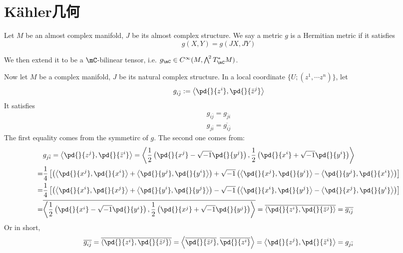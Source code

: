     \section{K\"ahler几何}
    \begin{definition}
        Let $M$ be an almost complex manifold, $J$ be its almost complex structure. We say a metric $g$ is a Hermitian metric if it satisfies
        \[
            g(X,Y)=g(JX,JY)
        \]
    \end{definition}
    We then extend it to be a $\mC$-bilinear tensor, i.e. $g_{\mC}\in C^{\infty}(M,\bigwedge^{\!2}T^*_{\mC}M)$. 

    Now let $M$ be a complex manifold, $J$ be its natural complex structure. In a local coordinate $\{U;(z^1,\cdots z^n)\}$, let
    \[
        g_{i\bar{j}}:=\left\langle \pd{}{z^i},\pd{}{\bar{z}^j}\right\rangle 
    \]
    It satisfies
    \begin{gather*}
        g_{i\bar{j}}=g_{\bar{j}i} \\
        g_{j\bar{i}}=\overline{g_{i\bar{j}}}
    \end{gather*}
    The first equality comes from the symmetirc of $g$. The second one comes from:
    \begin{align*}
    &g_{j\bar{i}} = \left\langle\pd{}{z^j},\pd{}{\bar{z}^i}\right\rangle = \left\langle\frac{1}{2}\left(\pd{}{x^j}-\sqrt{-1}\pd{}{y^j}\right), \frac{1}{2}\left(\pd{}{x^i}+\sqrt{-1}\pd{}{y^i}\right)\right\rangle \\
    =& \frac{1}{4} \left[\left(\left\langle\pd{}{x^j},\pd{}{x^i}\right\rangle+\left\langle\pd{}{y^j},\pd{}{y^i}\right\rangle\right)+\sqrt{-1}\left(\left\langle\pd{}{x^j},\pd{}{y^i}\right\rangle-\left\langle\pd{}{y^j},\pd{}{x^i}\right\rangle\right)\right] \\
    =& \frac{1}{4} \left[\left(\left\langle\pd{}{x^i},\pd{}{x^j}\right\rangle+\left\langle\pd{}{y^i},\pd{}{y^j}\right\rangle\right)-\sqrt{-1}\left(\left\langle\pd{}{x^i},\pd{}{y^j}\right\rangle-\left\langle\pd{}{x^j},\pd{}{y^i}\right\rangle\right)\right] \\
    =& \overline{\left\langle\frac{1}{2}\left(\pd{}{x^i}-\sqrt{-1}\pd{}{y^i}\right), \frac{1}{2}\left(\pd{}{x^j}+\sqrt{-1}\pd{}{y^j}\right)\right\rangle} = \overline{\left\langle\pd{}{z^i},\pd{}{\bar{z}^j}\right\rangle} = \overline{g_{i\bar{j}}}
    \end{align*}
    Or in short, 
    \begin{equation*}
        \overline{g_{i\bar{j}}} = \overline{\left\langle\pd{}{z^i},\pd{}{\bar{z}^j}\right\rangle} = \left\langle\overline{\pd{}{\bar{z}^j}},\overline{\pd{}{z^i}}\right\rangle = \left\langle\pd{}{z^j},\pd{}{\bar{z}^i}\right\rangle = g_{j\bar{i}} 
    \end{equation*}
